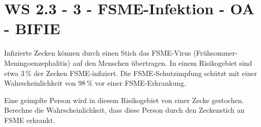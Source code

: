 \section{WS 2.3 - 3 - FSME-Infektion - OA - BIFIE}

\begin{beispiel}[WS 2.3]{1}
Infizierte Zecken können durch einen Stich das FSME-Virus (Frühsommer-Meningoenzephalitis) auf den Menschen übertragen. In einem Risikogebiet sind etwa 3\,\% der Zecken FSME-infiziert. Die FSME-Schutzimpfung schützt mit einer Wahrscheinlichkeit von 98\,\% vor einer FSME-Erkrankung. \leer

Eine geimpfte Person wird in diesem Risikogebiet von einer Zecke gestochen. Berechne die Wahrscheinlichkeit, dass diese Person durch den Zeckenstich an FSME erkrankt.

\end{beispiel}